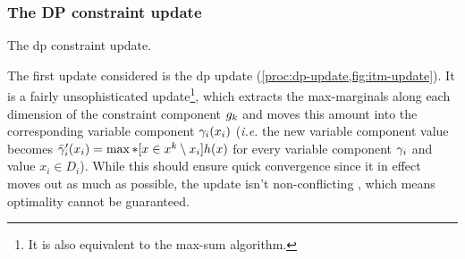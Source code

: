 \subsubsection{The DP constraint update}
\begin{algorithm}[t]

	\caption{
		The \gls{dp} constraint update.
	}
	\label{proc:dp-update}
\end{algorithm}
The first update considered is the \gls{dp} update (\cref{proc:dp-update,fig:itm-update}).
It is a fairly unsophisticated update\footnote{It is also equivalent to the max-sum algorithm.}, which extracts the max-marginals along each dimension of the constraint component \(g_k\) and moves this amount into the corresponding variable component \(\gamma_i(x_i)\) (\emph{i.e.} the new variable component value becomes \(\bar{\gamma}'_i(x_i) = \max*[x\in x^k\setminus x_i]{h(x)}\) for every variable component \(\gamma_i\) and value \(x_i\in D_i\)).
While this should ensure quick convergence since it in effect moves out as much as possible, the update isn't non-conflicting \parencite[\pno~105]{Wedelin08}, which means optimality cannot be guaranteed.

